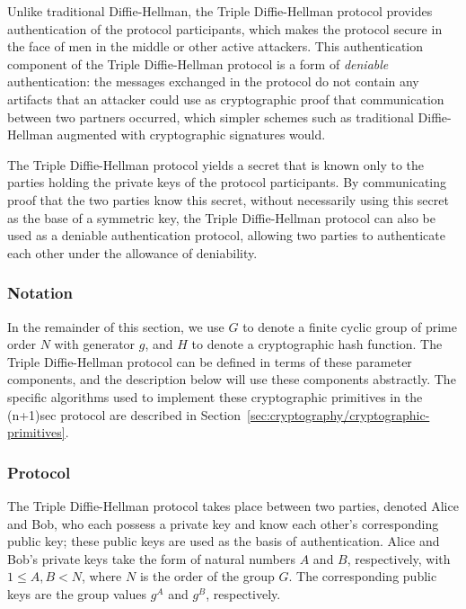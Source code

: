 \documentclass{article}
\begin{document}
Unlike traditional Diffie-Hellman, the Triple Diffie-Hellman protocol provides authentication of the protocol participants, which makes the protocol secure in the face of men in the middle or other active attackers.
This authentication component of the Triple Diffie-Hellman protocol is a form of \emph{deniable} authentication: the messages exchanged in the protocol do not contain any artifacts that an attacker could use as cryptographic proof that communication between two partners occurred, which simpler schemes such as traditional Diffie-Hellman augmented with cryptographic signatures would.

The Triple Diffie-Hellman protocol yields a secret that is known only to the parties holding the private keys of the protocol participants.
By communicating proof that the two parties know this secret, without necessarily using this secret as the base of a symmetric key, the Triple Diffie-Hellman protocol can also be used as a deniable authentication protocol, allowing two parties to authenticate each other under the allowance of deniability.


\subsubsection{Notation}
\label{sec:cryptography/triple-diffie-hellman/notation}

In the remainder of this section, we use $G$ to denote a finite cyclic group of prime order $N$ with generator $g$, and $H$ to denote a cryptographic hash function.
The Triple Diffie-Hellman protocol can be defined in terms of these parameter components, and the description below will use these components abstractly.
The specific algorithms used to implement these cryptographic primitives in the (n+1)sec protocol are described in Section~\ref{sec:cryptography/cryptographic-primitives}.


\subsubsection{Protocol}
\label{sec:cryptography/triple-diffie-hellman/protocol}

The Triple Diffie-Hellman protocol takes place between two parties, denoted Alice and Bob, who each possess a private key and know each other's corresponding public key; these public keys are used as the basis of authentication.
Alice and Bob's private keys take the form of natural numbers $A$ and $B$, respectively, with $1 \leq A, B < N$, where $N$ is the order of the group $G$.
The corresponding public keys are the group values $g^A$ and $g^B$, respectively.
\end{document}
